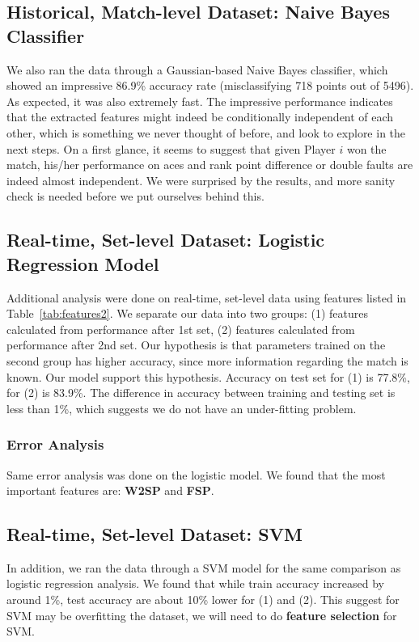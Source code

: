 \documentclass[paper=a4, fontsize=11pt]{scrartcl} %
\numberwithin{equation}{section} %
\numberwithin{figure}{section} %
\numberwithin{table}{section} %
\begin{document}
\subsection{Historical, Match-level Dataset: Naive Bayes Classifier}
We also ran the data through a Gaussian-based Naive Bayes classifier, which showed an impressive 86.9\% accuracy rate (misclassifying 718 points out of 5496). As expected, it was also extremely fast. The impressive performance indicates that the extracted features might indeed be conditionally independent of each other, which is something we never thought of before, and look to explore in the next steps. On a first glance, it seems to suggest that given Player $i$ won the match, his/her performance on aces and rank point difference or double faults are indeed almost independent. We were surprised by the results, and more sanity check is needed before we put ourselves behind this. 
\subsection{Real-time, Set-level Dataset: Logistic Regression Model}
Additional analysis were done on real-time, set-level data using features listed in Table~\ref{tab:features2}. We separate our data into two groups: (1) features calculated from performance after 1st set, (2) features calculated from performance after 2nd set.  Our hypothesis is that parameters trained on the second group has higher accuracy, since more information regarding the match is known.  Our model support this hypothesis.  Accuracy on test set for (1) is 77.8\%, for (2) is 83.9\%.  The difference in accuracy between training and testing set is less than 1\%, which suggests we do not have an under-fitting problem.
\subsubsection{Error Analysis}
Same error analysis was done on the logistic model.  We found that the most important features are: \textbf{W2SP} and \textbf{FSP}.
\subsection{Real-time, Set-level Dataset:  SVM}
In addition, we ran the data through a SVM model for the same comparison as logistic regression analysis.  We found that while train accuracy increased by around 1\%, test accuracy are about 10\%  lower for (1) and (2).  This suggest for SVM may be overfitting the dataset, we will need to do \textbf{feature selection} for SVM.
\end{document}
